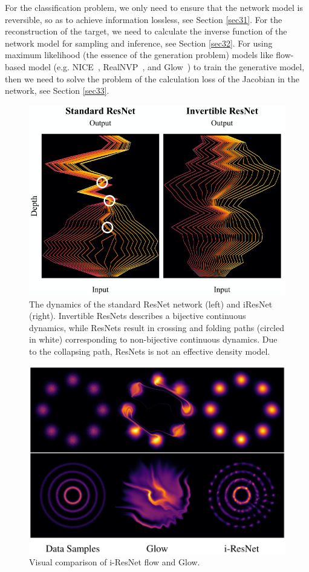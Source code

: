 \documentclass[final]{cvpr}
\begin{document}
For the classification problem, we only need to ensure that the network model is reversible, so as to achieve information lossless, see Section \ref{sec31}. For the reconstruction of the target, we need to calculate the inverse function of the network model for sampling and inference, see Section \ref{sec32}. For using maximum likelihood (the essence of the generation problem) models like flow-based model (e.g. NICE~\cite{dinh2014nice}, RealNVP~\cite{dinh2016density}, and Glow~\cite{kingma2018glow}) to train the generative model, then we need to solve the problem of the calculation loss of the Jacobian in the network, see Section \ref{sec33}.

\begin{figure}[t]
   \begin{center}
      \includegraphics[width=1.0\linewidth]{1621241932669.png}
   \end{center}
      \caption{The dynamics of the standard ResNet network (left) and iResNet (right). Invertible ResNets describes a bijective continuous dynamics, while ResNets result in crossing and folding paths (circled in white) corresponding to non-bijective continuous dynamics. Due to the collapsing path, ResNets is not an effective density model.}
   \label{fig:1}
\end{figure}

\begin{figure}[t]
   \begin{center}
      \includegraphics[width=0.7\linewidth]{1621944333639.png}
   \end{center}
      \caption{Visual comparison of i-ResNet flow and Glow.}
   \label{fig:2}
\end{figure}
\end{document}
